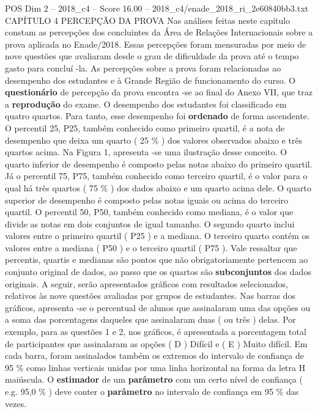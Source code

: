 \begin{textsample}{POS Dim 2 – 2018\_c4 – Score 16.00 – 2018\_c4/enade\_2018\_ri\_2e60840bb3.txt}  \label{ex:f2_pos_055}
CAPÍTULO 4 PERCEPÇÃO DA PROVA Nas análises feitas neste capítulo constam as percepções dos concluintes da Área de Relações Internacionais sobre a prova aplicada no Enade/2018.
Essas percepções foram mensuradas por meio de nove questões que avaliaram desde o grau de dificuldade da prova até o tempo gasto para concluí -la.
As percepções sobre a prova foram relacionadas ao desempenho dos estudantes e à Grande Região de funcionamento do curso.
O \textbf{questionário} de percepção da prova encontra -se ao final do Anexo VII, que traz a \textbf{reprodução} do exame.
O desempenho dos estudantes foi classificado em quatro quartos.
Para tanto, esse desempenho foi \textbf{ordenado} de forma ascendente.
O percentil 25, P25, também conhecido como primeiro quartil, é a nota de desempenho que deixa um quarto ( 25 \% ) dos valores observados abaixo e três quartos acima.
Na Figura 1, apresenta -se uma ilustração desse conceito.
O quarto inferior de desempenho é composto pelas notas abaixo do primeiro quartil.
Já o percentil 75, P75, também conhecido como terceiro quartil, é o valor para o qual há três quartos ( 75 \% ) dos dados abaixo e um quarto acima dele.
O quarto superior de desempenho é composto pelas notas iguais ou acima do terceiro quartil.
O percentil 50, P50, também conhecido como mediana, é o valor que divide as notas em dois conjuntos de igual tamanho.
O segundo quarto inclui valores entre o primeiro quartil ( P25 ) e a mediana.
O terceiro quarto contém os valores entre a mediana ( P50 ) e o terceiro quartil ( P75 ).
Vale ressaltar que percentis, quartis e medianas são pontos que não obrigatoriamente pertencem ao conjunto original de dados, ao passo que os quartos são \textbf{subconjuntos} dos dados originais.
A seguir, serão apresentados gráficos com resultados selecionados, relativos às nove questões avaliadas por grupos de estudantes.
Nas barras dos gráficos, apresenta -se o percentual de alunos que assinalaram uma das opções ou a soma das porcentagens daqueles que assinalaram duas ( ou três ) delas.
Por exemplo, para as questões 1 e 2, nos gráficos, é apresentada a porcentagem total de participantes que assinalaram as opções ( D ) Difícil e ( E ) Muito difícil.
Em cada barra, foram assinalados também os extremos do intervalo de confiança de 95 \% como linhas verticais unidas por uma linha horizontal na forma da letra H maiúscula.
O \textbf{estimador} de um \textbf{parâmetro} com um certo nível de confiança ( e.g. 95,0 \% ) deve conter o \textbf{parâmetro} no intervalo de confiança em 95 \% das vezes.

\end{textsample}
